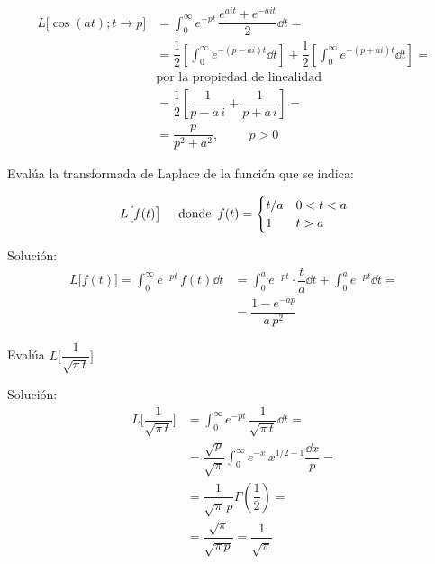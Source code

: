 \begin{ejemplo}
\begin{align*}
L \big[\cos (a t); t \to p\big] &= \int_{0}^{\infty} e^{-p t} \,\dfrac{e^{a i t} + e^{- a i t}}{2} \dd{t} = \\[0.5em]
&= \dfrac{1}{2} \left[ \int_{0}^{\infty} e^{-(p - a i) t} \dd{t} \right] + \dfrac{1}{2} \left[ \int_{0}^{\infty} e^{-(p + a i) t} \dd{t} \right] = \\[0.5em]
&\mbox{por la propiedad de linealidad  } \\[0.5em]
&= \dfrac{1}{2} \left[ \dfrac{1}{p - a \, i} + \dfrac{1}{p + a \, i}\right] = \\[0.5em]
&= \dfrac{p}{p^{2} + a^{2}}, \hspace{1cm} p > 0
\end{align*}
\end{ejemplo}
Evalúa la transformada de Laplace de la función que se indica:
\begin{ejemplo}
\begin{align*}
L\big[f(t)\big] \hspace{0.5cm} \mbox{donde} \hspace{0.5em} f(t) = \begin{cases}
t/a & 0 < t < a \\
1 & t > a
\end{cases}
\end{align*}

Solución:
\begin{align*}
L\big[f(t)\big] = \int_{0}^{\infty} e^{-p t} \, f(t) \dd{t}  &= \int_{0}^{a} e^{-p t} \cdot \dfrac{t}{a} \dd{t} + \int_{0}^{a} e^{-p t} \dd{t} = \\[0.5em]
&=\dfrac{1 - e^{- a p}}{a \, p^{2}}
\end{align*}
\end{ejemplo}
\begin{ejemplo}
Evalúa $L \bigg[\dfrac{1}{\sqrt{\pi \, t}}\bigg]$

Solución:
\begin{align*}
L \bigg[\dfrac{1}{\sqrt{\pi \, t}}\bigg] &= \int_{0}^{\infty} e^{- p t} \, \dfrac{1}{\sqrt{\pi \, t}} \dd{t} = \\[0.5em]
&= \dfrac{\sqrt{p}}{\sqrt{\pi}} \int_{0}^{\infty} e^{-x} \, x^{1/2 - 1} \dfrac{\dd{x}}{p} = \\[0.5em]
&= \dfrac{1}{\sqrt{\pi} \, p} \Gamma \left( \dfrac{1}{2} \right) = \\[0.5em]
&= \dfrac{\sqrt{\pi}}{\sqrt{\pi \, p}} = \dfrac{1}{\sqrt{\pi}}
\end{align*}
\end{ejemplo}

